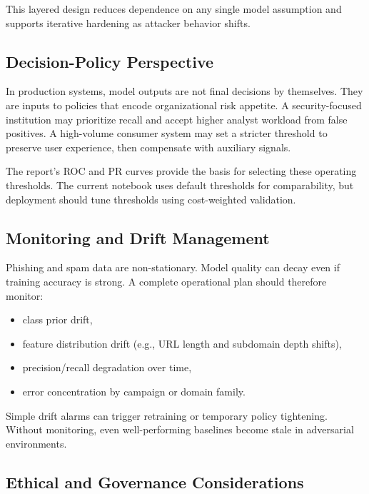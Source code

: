 This layered design reduces dependence on any single model assumption and supports iterative hardening as attacker behavior shifts.

\subsection{Decision-Policy Perspective}

In production systems, model outputs are not final decisions by themselves. They are inputs to policies that encode organizational risk appetite. A security-focused institution may prioritize recall and accept higher analyst workload from false positives. A high-volume consumer system may set a stricter threshold to preserve user experience, then compensate with auxiliary signals.

The report's ROC and PR curves provide the basis for selecting these operating thresholds. The current notebook uses default thresholds for comparability, but deployment should tune thresholds using cost-weighted validation.

\subsection{Monitoring and Drift Management}

Phishing and spam data are non-stationary. Model quality can decay even if training accuracy is strong. A complete operational plan should therefore monitor:
\begin{itemize}
    \item class prior drift,
    \item feature distribution drift (e.g., URL length and subdomain depth shifts),
    \item precision/recall degradation over time,
    \item error concentration by campaign or domain family.
\end{itemize}

Simple drift alarms can trigger retraining or temporary policy tightening. Without monitoring, even well-performing baselines become stale in adversarial environments.

\subsection{Ethical and Governance Considerations}

